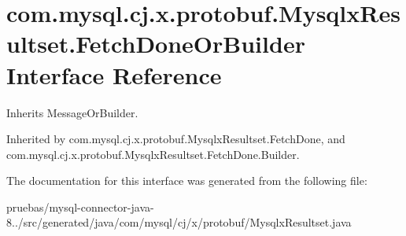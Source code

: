 \hypertarget{interfacecom_1_1mysql_1_1cj_1_1x_1_1protobuf_1_1_mysqlx_resultset_1_1_fetch_done_or_builder}{}\section{com.\+mysql.\+cj.\+x.\+protobuf.\+Mysqlx\+Resultset.\+Fetch\+Done\+Or\+Builder Interface Reference}
\label{interfacecom_1_1mysql_1_1cj_1_1x_1_1protobuf_1_1_mysqlx_resultset_1_1_fetch_done_or_builder}


Inherits Message\+Or\+Builder.



Inherited by com.\+mysql.\+cj.\+x.\+protobuf.\+Mysqlx\+Resultset.\+Fetch\+Done, and com.\+mysql.\+cj.\+x.\+protobuf.\+Mysqlx\+Resultset.\+Fetch\+Done.\+Builder.



The documentation for this interface was generated from the following file\+:\begin{DoxyCompactItemize}
\item 
pruebas/mysql-\/connector-\/java-\/8../src/generated/java/com/mysql/cj/x/protobuf/Mysqlx\+Resultset.\+java\end{DoxyCompactItemize}
